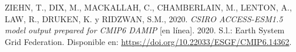 \documentclass[12pt,oneside,a4paper]{reedthesis}
\newlength{\cslhangindent}
\newenvironment{CSLReferences}[2] %
 {%
  \setlength{\parindent}{0pt}
  \ifodd #1 \everypar{\setlength{\hangindent}{\cslhangindent}}\ignorespaces\fi
  \ifnum #2 > 0
  \setlength{\parskip}{#2\baselineskip}
  \fi
 }%
 {}
\begin{document}
\begin{CSLReferences}{1}{0}
\leavevmode{}%
ZIEHN, T., DIX, M., MACKALLAH, C., CHAMBERLAIN, M., LENTON, A., LAW, R., DRUKEN, K. y RIDZWAN, S.M., 2020. \emph{CSIRO ACCESS-ESM1.5 model output prepared for CMIP6 DAMIP} {[}en línea{]}. 2020. S.l.: Earth System Grid Federation. Disponible en: \url{https://doi.org/10.22033/ESGF/CMIP6.14362}.

\end{CSLReferences}


\end{document}

